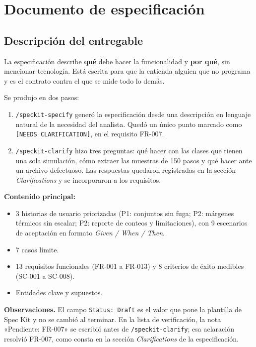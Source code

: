 \documentclass[12pt,a4paper]{article}
\begin{document}
\newpage
\section{Documento de especificación}

\subsection{Descripción del entregable}
La especificación describe \textbf{qué} debe hacer la funcionalidad y \textbf{por qué}, sin mencionar tecnología. Está escrita para que la entienda alguien que no programa y es el contrato contra el que se mide todo lo demás.

Se produjo en dos pasos:
\begin{enumerate}
  \item \texttt{/speckit-specify} generó la especificación desde una descripción en lenguaje natural de la necesidad del analista. Quedó un único punto marcado como \texttt{[NEEDS CLARIFICATION]}, en el requisito FR-007.
  \item \texttt{/speckit-clarify} hizo tres preguntas: qué hacer con las clases que tienen una sola simulación, cómo extraer las muestras de 150 pasos y qué hacer ante un archivo defectuoso. Las respuestas quedaron registradas en la sección \textit{Clarifications} y se incorporaron a los requisitos.
\end{enumerate}

\textbf{Contenido principal:}
\begin{itemize}
  \item 3 historias de usuario priorizadas (P1: conjuntos sin fuga; P2: márgenes térmicos sin escalar; P2: reporte de conteos y limitaciones), con 9 escenarios de aceptación en formato \textit{Given / When / Then}.
  \item 7 casos límite.
  \item 13 requisitos funcionales (FR-001 a FR-013) y 8 criterios de éxito medibles (SC-001 a SC-008).
  \item Entidades clave y supuestos.
\end{itemize}

\textbf{Observaciones.} El campo \texttt{Status: Draft} es el valor que pone la plantilla de Spec Kit y no se cambió al terminar. En la lista de verificación, la nota «Pendiente: FR-007» se escribió antes de \texttt{/speckit-clarify}; esa aclaración resolvió FR-007, como consta en la sección \textit{Clarifications} de la especificación.
\end{document}
